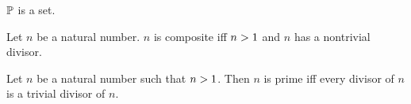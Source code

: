 \documentclass[../arithmetic.tex]{subfiles}
\begin{document}
  \begin{forthel}
    \begin{proposition}
      $\mathbb{P}$ is a set.
    \end{proposition}
  \end{forthel}

  \begin{forthel}
    \begin{definition}
      Let $n$ be a natural number.
      $n$ is composite iff $n > 1$ and $n$ has a nontrivial divisor.
    \end{definition}
  \end{forthel}

  \begin{forthel}
    \begin{proposition}
      Let $n$ be a natural number such that $n > 1$.
      Then $n$ is prime iff every divisor of $n$ is a trivial divisor of $n$.
    \end{proposition}
  \end{forthel}
\end{document}
